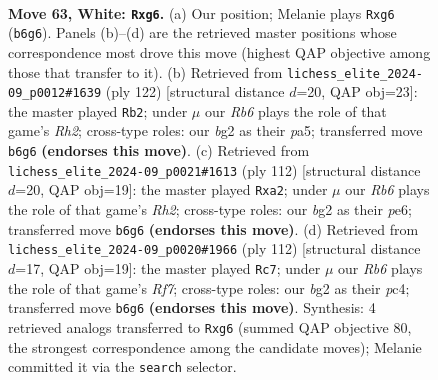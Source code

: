 \documentclass[11pt]{article}
\begin{document}
\clearpage

\begin{figure}[p]\centering
\begin{subfigure}{0.46\textwidth}\centering
\resizebox{\linewidth}{!}{%
\newchessgame
\chessboard[
  setfen={8/3k4/1R4p1/8/1P6/R7/1r4b1/6K1 w - - 4 63},
  showmover=false,
  pgfstyle=straightmove, color=movearrow, markmove={b6-g6}
]}
\caption{}
\end{subfigure}\hfill
\begin{subfigure}{0.46\textwidth}\centering
\resizebox{\linewidth}{!}{%
\newchessgame
\chessboard[
  setfen={8/8/8/p6r/K2k3P/8/7R/8 w - - 22 62},
  showmover=false,
  pgfstyle=straightmove, color=movearrow, markmove={h2-b2}
]}
\caption{}
\end{subfigure}
\\[4pt]
\begin{subfigure}{0.46\textwidth}\centering
\resizebox{\linewidth}{!}{%
\newchessgame
\chessboard[
  setfen={7r/5k1P/4p3/4K3/8/8/p6R/8 w - - 0 57},
  showmover=false,
  pgfstyle=straightmove, color=movearrow, markmove={h2-a2}
]}
\caption{}
\end{subfigure}\hfill
\begin{subfigure}{0.46\textwidth}\centering
\resizebox{\linewidth}{!}{%
\newchessgame
\chessboard[
  setfen={4k3/5R2/8/3K1P2/2p2r2/8/8/8 w - - 2 57},
  showmover=false,
  pgfstyle=straightmove, color=movearrow, markmove={f7-c7}
]}
\caption{}
\end{subfigure}
\caption{\textbf{Move 63, White: \texttt{Rxg6}.} (a) Our position; Melanie plays \texttt{Rxg6} (\texttt{b6g6}). Panels (b)--(d) are the retrieved master positions whose correspondence most drove this move (highest QAP objective among those that transfer to it). (b) Retrieved from \texttt{lichess\_elite\_2024-09\_p0012\#1639} (ply 122) [structural distance $d$=20, QAP obj=23]: the master played \texttt{Rb2}; under $\mu$ our \emph{Rb6} plays the role of that game's \emph{Rh2}; cross-type roles: our \emph{b}g2 as their \emph{p}a5; transferred move \texttt{b6g6} \textbf{(endorses this move)}. (c) Retrieved from \texttt{lichess\_elite\_2024-09\_p0021\#1613} (ply 112) [structural distance $d$=20, QAP obj=19]: the master played \texttt{Rxa2}; under $\mu$ our \emph{Rb6} plays the role of that game's \emph{Rh2}; cross-type roles: our \emph{b}g2 as their \emph{p}e6; transferred move \texttt{b6g6} \textbf{(endorses this move)}. (d) Retrieved from \texttt{lichess\_elite\_2024-09\_p0020\#1966} (ply 112) [structural distance $d$=17, QAP obj=19]: the master played \texttt{Rc7}; under $\mu$ our \emph{Rb6} plays the role of that game's \emph{Rf7}; cross-type roles: our \emph{b}g2 as their \emph{p}c4; transferred move \texttt{b6g6} \textbf{(endorses this move)}. Synthesis: 4 retrieved analogs transferred to \texttt{Rxg6} (summed QAP objective 80, the strongest correspondence among the candidate moves); Melanie committed it via the \texttt{search} selector.}
\label{fig:thought-m124}
\end{figure}
\end{document}
